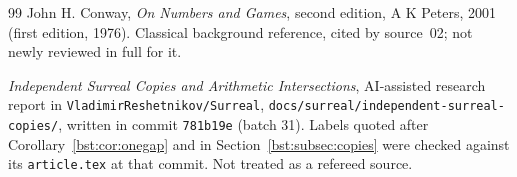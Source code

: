 \documentclass[11pt,letterpaper]{article}
\theoremstyle{definition}
\theoremstyle{remark}
\newcommand{\repo}{\texttt{VladimirReshetnikov/Surreal}}
\begin{document}
\begin{thebibliography}{99}
John H. Conway,
\emph{On Numbers and Games}, second edition, A K Peters, 2001
(first edition, 1976). Classical background reference, cited by source~02;
not newly reviewed in full for it.

\emph{Independent Surreal Copies and Arithmetic Intersections}, AI-assisted
research report in \repo, \texttt{docs/surreal/independent-surreal-copies/},
written in commit \texttt{781b19e} (batch 31). Labels quoted after
Corollary~\ref{bst:cor:onegap} and in Section~\ref{bst:subsec:copies} were checked
against its \texttt{article.tex} at that commit. Not treated as a refereed source.
\end{thebibliography}
\end{document}
